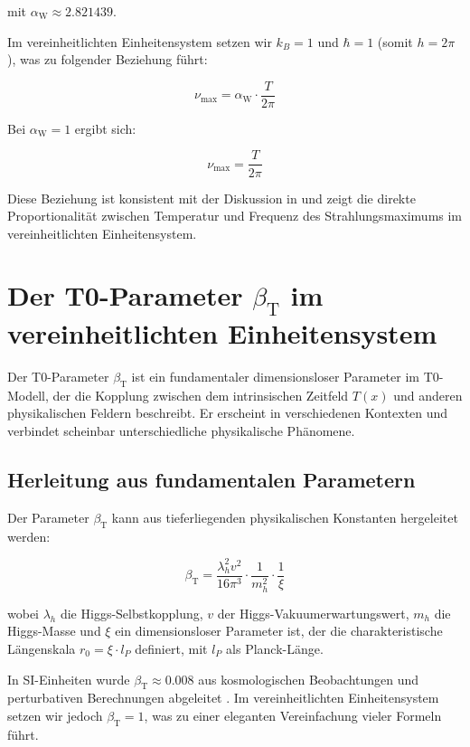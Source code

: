 \documentclass[12pt,a4paper]{article}
\newcommand{\Tfield}{T(x)}
\newcommand{\betaT}{\beta_{\text{T}}}
\newcommand{\alphaW}{\alpha_{\text{W}}}
\begin{document}
	mit \(\alphaW \approx 2.821439\).
	
	Im vereinheitlichten Einheitensystem setzen wir \(k_B = 1\) und \(\hbar = 1\) (somit \(h = 2\pi\)), was zu folgender Beziehung führt:
	
	\begin{equation}
		\nu_{\text{max}} = \alphaW \cdot \frac{T}{2\pi}
	\end{equation}
	
	Bei \(\alphaW = 1\) ergibt sich:
	
	\begin{equation}
		\nu_{\text{max}} = \frac{T}{2\pi}
	\end{equation}
	
	Diese Beziehung ist konsistent mit der Diskussion in \cite{pascher_temp_2025} und zeigt die direkte Proportionalität zwischen Temperatur und Frequenz des Strahlungsmaximums im vereinheitlichten Einheitensystem.
	
	\section{Der T0-Parameter \(\betaT\) im vereinheitlichten Einheitensystem}
	
	Der T0-Parameter \(\betaT\) ist ein fundamentaler dimensionsloser Parameter im T0-Modell, der die Kopplung zwischen dem intrinsischen Zeitfeld \(\Tfield\) und anderen physikalischen Feldern beschreibt. Er erscheint in verschiedenen Kontexten und verbindet scheinbar unterschiedliche physikalische Phänomene.
	
	\subsection{Herleitung aus fundamentalen Parametern}
	
	Der Parameter \(\betaT\) kann aus tieferliegenden physikalischen Konstanten hergeleitet werden:
	
	\begin{equation}
		\betaT = \frac{\lambda_h^2 v^2}{16\pi^3} \cdot \frac{1}{m_h^2} \cdot \frac{1}{\xi}
	\end{equation}
	
	wobei \(\lambda_h\) die Higgs-Selbstkopplung, \(v\) der Higgs-Vakuumerwartungswert, \(m_h\) die Higgs-Masse und \(\xi\) ein dimensionsloser Parameter ist, der die charakteristische Längenskala \(r_0 = \xi \cdot l_P\) definiert, mit \(l_P\) als Planck-Länge.
	
	In SI-Einheiten wurde \(\betaT \approx 0.008\) aus kosmologischen Beobachtungen und perturbativen Berechnungen abgeleitet \cite{pascher_params_2025}. Im vereinheitlichten Einheitensystem setzen wir jedoch \(\betaT = 1\), was zu einer eleganten Vereinfachung vieler Formeln führt.
	
\end{document}
